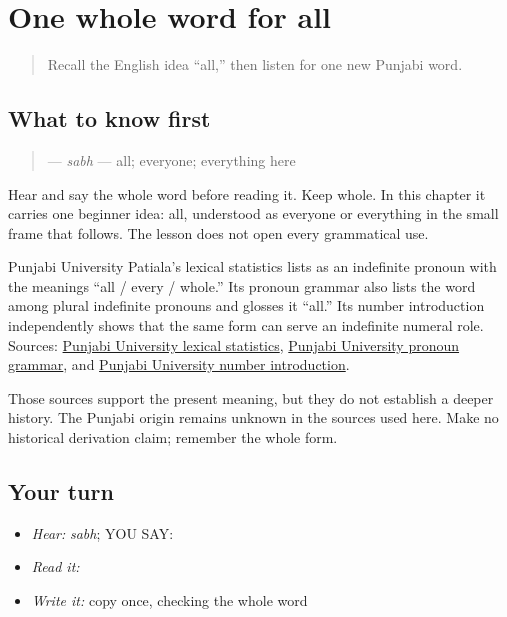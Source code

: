 \section[\texorpdfstring{\pa{ਸਭ} (sabh)}{ਸਭ (sabh)}]{One whole word for all}

\label{lesson:PA-C205-sabh}



\begin{quote}
Recall the English idea “all,” then listen for one new Punjabi word.
\end{quote}

\subsection*{What to know first}
\begin{quote}
\textbf{} — \emph{sabh} — all; everyone; everything here
\end{quote}

Hear and say the whole word before reading it. Keep \textbf{} whole. In this chapter it carries one beginner idea: all, understood as everyone or everything in the small frame that follows. The lesson does not open every grammatical use.

\begin{cousinweb}
Punjabi University Patiala's lexical statistics lists \textbf{} as an indefinite pronoun with the meanings “all / every / whole.” Its pronoun grammar also lists the word among plural indefinite pronouns and glosses it “all.” Its number introduction independently shows that the same form can serve an indefinite numeral role. Sources: \href{https://www.learnpunjabi.org/statistics.html}{Punjabi University lexical statistics}, \href{https://www.learnpunjabi.org/Pronoun.html}{Punjabi University pronoun grammar}, and \href{https://www.learnpunjabi.org/numbers\_intro.html}{Punjabi University number introduction}.

Those sources support the present meaning, but they do not establish a deeper history. The Punjabi origin remains unknown in the sources used here. Make no historical derivation claim; remember the whole form.
\end{cousinweb}

\subsection*{Your turn}
\begin{itemize}
\raggedright
  \item \emph{Hear:} \emph{sabh}; YOU SAY: \textbf{}
  \item \emph{Read it:} \textbf{}
  \item \emph{Write it:} copy \textbf{} once, checking the whole word
\end{itemize}

